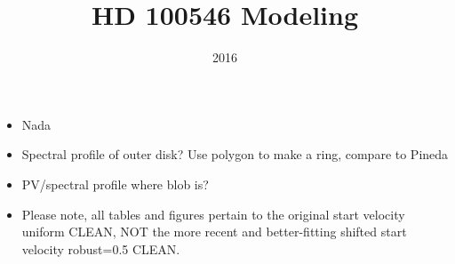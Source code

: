 \documentclass[a4paper]{tufte-handout}
\title{HD 100546 Modeling}
\date{2016}
\begin{document}
\maketitle

\listoftables
\listoffigures

\hrulefill

\begin{tasks}
    \begin{itemize}
      \item Nada
    \end{itemize}
\end{tasks}


\begin{maybe}
    \begin{itemize}
      \item Spectral profile of outer disk? Use polygon to make a ring, compare to Pineda
      \item PV/spectral profile where blob is?
    \end{itemize}
\end{maybe}


\begin{cath}
    \begin{itemize}
      \item Please note, all tables and figures pertain to the original start velocity uniform CLEAN, NOT the more recent and better-fitting shifted start velocity robust=0.5 CLEAN.
    \end{itemize}

\end{cath}

\end{document}
